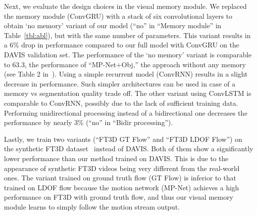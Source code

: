 Next, we evaluate the design choices in the visual memory module. We replaced
the memory module (ConvGRU) with a stack of six convolutional layers to obtain
`no memory' variant of our model (``no'' in ``Memory module'' in
Table~\ref{tbl:abl}), but with the same number of parameters. This variant
results in a 6\% drop in performance compared to our full model with ConvGRU on
the DAVIS validation set. The performance of the `no memory' variant is
comparable to 63.3, the performance of ``MP-Net+Obj,'' the approach without any
memory (see Table 2 in~\cite{tokmakov2016learning}). Using a simple recurrent
model (ConvRNN) results in a slight decrease in performance. Such simpler
architectures can be used in case of a memory vs segmentation quality trade
off. The other variant using ConvLSTM is comparable to ConvRNN, possibly due to
the lack of sufficient training data. Performing unidirectional processing
instead of a bidirectional one decreases the performance by nearly 3\% (``no''
in ``Bidir processing'').

Lastly, we train two variants (``FT3D GT Flow'' and ``FT3D LDOF Flow'') on the
synthetic FT3D dataset~\cite{Mayer16} instead of DAVIS. Both of them show a
significantly lower performance than our method trained on DAVIS. This is due
to the appearance of synthetic FT3D videos being very different from the
real-world ones. The variant trained on ground truth flow (GT Flow) is inferior
to that trained on LDOF flow because the motion network (MP-Net) achieves a
high performance on FT3D with ground truth flow, and thus our visual memory
module learns to simply follow the motion stream output.

